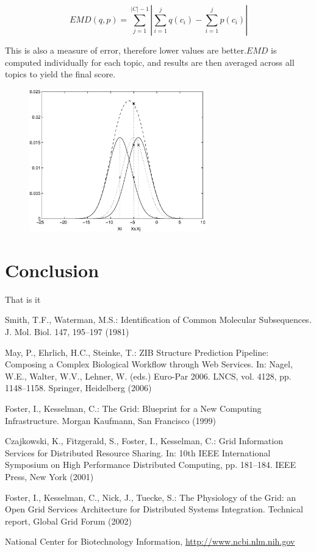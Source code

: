 \documentclass[runningheads,a4paper]{llncs}
\begin{document}
\begin{equation}
EMD(q, p) = \sum_{j=1}^{|C| - 1}|\sum_{i=1}^jq(c_i) - \sum_{i=1}^jp(c_i)|
\end{equation}

This is also a measure of error, therefore lower values are better.$EMD$ is computed individually for each topic, and results are then averaged across all topics to yield the final score.
\begin{figure}
\centering
\includegraphics[height=6.2cm]{eijkel2}
\caption{}
\label{fig:example}
\end{figure}


\section{Conclusion}
That is it






\begin{thebibliography}{4}

 Smith, T.F., Waterman, M.S.: Identification of Common Molecular
Subsequences. J. Mol. Biol. 147, 195--197 (1981)

 May, P., Ehrlich, H.C., Steinke, T.: ZIB Structure Prediction Pipeline:
Composing a Complex Biological Workflow through Web Services. In: Nagel,
W.E., Walter, W.V., Lehner, W. (eds.) Euro-Par 2006. LNCS, vol. 4128,
pp. 1148--1158. Springer, Heidelberg (2006)

 Foster, I., Kesselman, C.: The Grid: Blueprint for a New Computing
Infrastructure. Morgan Kaufmann, San Francisco (1999)

 Czajkowski, K., Fitzgerald, S., Foster, I., Kesselman, C.: Grid
Information Services for Distributed Resource Sharing. In: 10th IEEE
International Symposium on High Performance Distributed Computing, pp.
181--184. IEEE Press, New York (2001)

 Foster, I., Kesselman, C., Nick, J., Tuecke, S.: The Physiology of the
Grid: an Open Grid Services Architecture for Distributed Systems
Integration. Technical report, Global Grid Forum (2002)

 National Center for Biotechnology Information, \url{http://www.ncbi.nlm.nih.gov}

\end{thebibliography}
\end{document}
